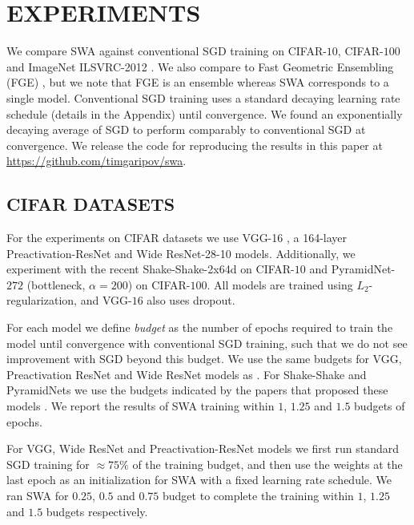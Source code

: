 \documentclass[letterpaper]{article}
\begin{document}
\section{EXPERIMENTS}
\label{sec:experiments}

We compare SWA against conventional SGD training 
on CIFAR-$10$, CIFAR-$100$ and
ImageNet ILSVRC-2012 \citep{russakovsky2015imagenet}.
We also compare to Fast Geometric Ensembling (FGE)
\citep{garipov2018}, but we note that FGE is an ensemble 
whereas SWA corresponds to a single model.  Conventional
SGD training uses a standard decaying learning rate schedule
(details in the Appendix) until convergence. 
We found an exponentially decaying average of 
SGD to perform comparably to conventional SGD at 
convergence. We release the code for reproducing the 
results in this paper at \url{https://github.com/timgaripov/swa}.

\subsection{CIFAR DATASETS}
\label{sec:cifar}

For the experiments on CIFAR datasets we use VGG-16 \citep{simonyan2014very},
a 164-layer Preactivation-ResNet \citep{he2016deep} and Wide
ResNet-28-10 \citep{zagoruyko2016wide} models. Additionally,  we
experiment with the recent Shake-Shake-2x64d \citep{gastaldi2017shake} on CIFAR-$10$
and PyramidNet-$272$ (bottleneck, $\alpha=200$) \citep{han2016deep} on CIFAR-$100$.
All models are trained using $L_2$-regularization, and VGG-$16$ also uses dropout.

For each model we define {\it budget} as the number of epochs required to train
the model until convergence with conventional SGD training, such that we do not
see improvement with SGD beyond this budget.
We use the same budgets for VGG, Preactivation ResNet and Wide ResNet models as 
\citet{garipov2018}. For Shake-Shake and PyramidNets we use the budgets indicated by
the papers that proposed these models \citep{gastaldi2017shake, han2016deep}.
We report the results of SWA training within
$1$, $1.25$ and $1.5$ budgets of epochs.

For VGG, Wide ResNet and Preactivation-ResNet models we first run standard SGD
training for $\approx 75\%$ of the training budget, and then use
the weights at the last epoch as an initialization for SWA with a fixed learning
rate schedule. We ran SWA for $0.25$, $0.5$ and $0.75$ budget to complete
the training within $1$, $1.25$ and $1.5$ budgets respectively.
\end{document}
